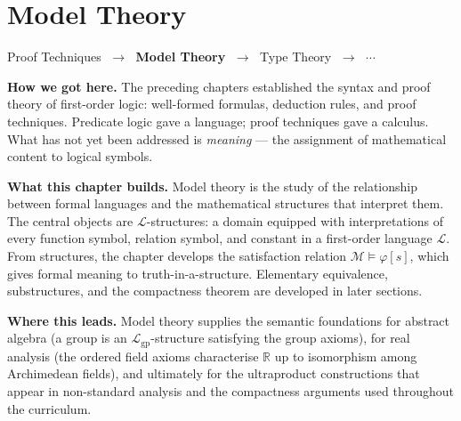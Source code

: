 
\chapter{Model Theory}


\begin{tcolorbox}[
  colback=gray!6,
  colframe=gray!40,
  arc=2pt,
  left=8pt, right=8pt, top=6pt, bottom=6pt,
  title={\small\textbf{Where You Are in the Journey}},
  fonttitle=\small\bfseries
]
\begin{center}
\small
Proof Techniques
$\;\to\;$ \textbf{Model Theory}
$\;\to\;$ Type Theory
$\;\to\;$ $\cdots$
\end{center}

\medskip
\noindent\textbf{How we got here.}
The preceding chapters established the syntax and proof theory of
first-order logic: well-formed formulas, deduction rules, and proof
techniques. Predicate logic gave a language; proof techniques gave a
calculus. What has not yet been addressed is \emph{meaning} — the
assignment of mathematical content to logical symbols.

\medskip
\noindent\textbf{What this chapter builds.}
Model theory is the study of the relationship between formal languages
and the mathematical structures that interpret them. The central objects
are $\mathcal{L}$-structures: a domain equipped with interpretations of
every function symbol, relation symbol, and constant in a first-order
language $\mathcal{L}$. From structures, the chapter develops the
satisfaction relation $\mathcal{M} \models \varphi[s]$, which gives
formal meaning to truth-in-a-structure. Elementary equivalence,
substructures, and the compactness theorem are developed in later sections.

\medskip
\noindent\textbf{Where this leads.}
Model theory supplies the semantic foundations for abstract algebra
(a group is an $\mathcal{L}_{\mathrm{gp}}$-structure satisfying the
group axioms), for real analysis (the ordered field axioms characterise
$\mathbb{R}$ up to isomorphism among Archimedean fields), and
ultimately for the ultraproduct constructions that appear in non-standard
analysis and the compactness arguments used throughout the curriculum.
\end{tcolorbox}
\vspace{1em}


